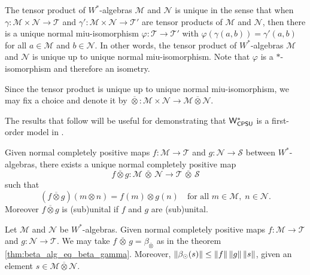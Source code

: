 \begin{proposition} \cite[Exercise 114 II]{westerbaanCategoryNeumannAlgebras2019} \label{prop:tenso_w_unique}
   The tensor product of $W^*$-algebras $\mathscr{M}$ and $\mathscr{N}$ is unique in the sense that when $\gamma \colon \mathscr{M} \times \mathscr{N} \to \mathscr{T}$ and $\gamma' \colon \mathscr{M} \times \mathscr{N} \to \mathscr{T'}$ are tensor products of $\mathscr{M}$ and $\mathscr{N}$, then there is a unique normal miu-isomorphism $\varphi \colon \mathscr{T} \to \mathscr{T'}$ with $\varphi(\gamma(a,b)) = \gamma'(a,b)$ for all $a \in \mathscr{M}$ and $b \in \mathscr{N}$. In other words, the tensor product of $W^*$-algebras $\mathscr{M}$ and $\mathscr{N}$ is unique up to unique normal miu-isomorphism. Note that $\varphi$ is a $*$-isomorphism and therefore an isometry.
\end{proposition}

Since the tensor product is unique up to unique normal miu-isomorphism, we may fix a choice and denote it by 
$\overline{\otimes} \colon \mathscr{M} \times \mathscr{N} \to \mathscr{M} \mathbin{\overline{\otimes}} \mathscr{N}.$

The results that follow will be useful for demonstrating that $\mathsf{W^*_{CPSU}}$ is a first-order model in .


\begin{proposition} \cite[Proposition 115 II]{westerbaanCategoryNeumannAlgebras2019} \label{prop:mapa_tensor_w_u_ncpsu}
Given normal completely positive  maps \( f : \mathscr{M} \to \mathscr{T} \) and \( g : \mathscr{N} \to \mathcal{S} \) between $W^*$-algebras, there exists a unique normal completely positive map
\[
f \overline{\otimes} g: \mathscr{M} \,\overline{\otimes}\, \mathscr{N} \to \mathscr{T} \,\overline{\otimes}\, \mathscr{S}
\]
such that
\[
(f \overline{\otimes} g)(m \otimes n) = f(m) \otimes g(n)
\quad \text{for all } m \in \mathscr{M},\; n \in \mathscr{N}.
\]
Moreover \( f \overline{\otimes} g \) is (sub)unital if \( f \) and \( g \) are (sub)unital.
\end{proposition}

\begin{proposition} \cite[Proof 115 III] {westerbaanCategoryNeumannAlgebras2019} \label{prop:norm_beta_alg}
  Let  $\mathscr{M}$ and $\mathscr{N}$ be $W^*$-algebras.
  Given normal completely positive maps $f:\mathscr{M} \to \mathscr{T}$ and $g:\mathscr{N} \to \mathscr{T}$. We may take $ f \, \overline{\otimes} \, g = \beta_{\bar{\otimes}}$ as in the theorem \autoref{thm:beta_alg_eq_beta_gamma}. Moreover, $\left\lVert \beta_\odot(s) \right\rVert \leq \left\lVert f \right\rVert\left\lVert g \right\rVert\left\lVert s \right\rVert$, given an element $s\in \mathscr{M} \overline{\otimes} \mathscr{N}$.
\end{proposition}

